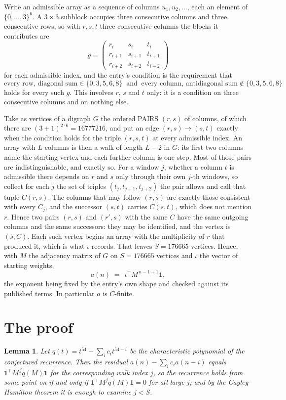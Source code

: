 \documentclass[11pt,a4paper]{article}
\theoremstyle{plain}
\newtheorem{lemma}[theorem]{Lemma}
\theoremstyle{definition}
\begin{document}
Write an admissible array as a sequence of columns $u_1,u_2,\dots$, each an element of
$\{0,\dots,3\}^{6}$. A $3\times3$ subblock occupies three consecutive columns and
three consecutive rows, so with $r,s,t$ three consecutive columns the blocks it
contributes are
\[
g=\begin{pmatrix}r_i&s_i&t_i\\ r_{i+1}&s_{i+1}&t_{i+1}\\ r_{i+2}&s_{i+2}&t_{i+2}\end{pmatrix}
\]
for each admissible index, and the entry's condition is the requirement that
\[
\text{every row, diagonal sum} \in \{0,3,5,6,8\}\ \text{ and }\ \text{every column, antidiagonal sum} \notin \{0,3,5,6,8\}
\]
holds for every such $g$. This involves $r$, $s$ and $t$ only: it is a condition on
three consecutive columns and on nothing else.

Take as vertices of a digraph $G$ the ordered PAIRS $(r,s)$ of columns, of which there are
$(3+1)^{2\cdot6}=16777216$, and put an edge $(r,s)\to(s,t)$ exactly when the condition
holds for the triple $(r,s,t)$ at every admissible index. An array with $L$ columns is then a
walk of length $L-2$ in $G$: its first two columns name the starting vertex and each further
column is one step. Most of those pairs are indistinguishable, and exactly so. For a window $j$, whether a column $t$ is admissible there depends on $r$ and $s$ only through their own $j$-th windows, so collect for each $j$ the set of triples $(t_j,t_{j+1},t_{j+2})$ the pair allows and call that tuple $C(r,s)$. The columns that may follow $(r,s)$ are exactly those consistent with every $C_j$, and the successor $(s,t)$ carries $C(s,t)$, which does not mention $r$. Hence two pairs $(r,s)$ and $(r',s)$ with the same $C$ have the same outgoing columns and the same successors: they may be identified, and the vertex is $(s,C)$. Each such vertex begins an array with the multiplicity of $r$ that produced it, which is what $\iota$ records. That leaves $S=176665$ vertices. Hence, with $M$ the adjacency matrix of $G$ on $S=176665$ vertices and
$\iota$ the vector of starting weights,
\[
a(n)\;=\;\,\iota^{\!\top}M^{\,n-1+1}\mathbf{1},
\]
the exponent being fixed by the entry's own shape and checked against its published terms.
In particular $a$ is $C$-finite.

\section{The proof}

\begin{lemma}\label{lem:crit}
Let $q(t)=t^{54}-\sum_i c_it^{54-i}$ be the characteristic polynomial of the
conjectured recurrence. Then the residual $a(n)-\sum_ic_ia(n-i)$ equals
$\mathbf{1}^{\!\top}M^{\,j}q(M)\mathbf{1}$ for the corresponding walk index
$j$, so the recurrence holds from some point on if and only if
$\mathbf{1}^{\!\top}M^{j}q(M)\mathbf{1}=0$ for all large $j$; and by the
Cayley--Hamilton theorem it is enough to examine $j<S$.
\end{lemma}
\end{document}
